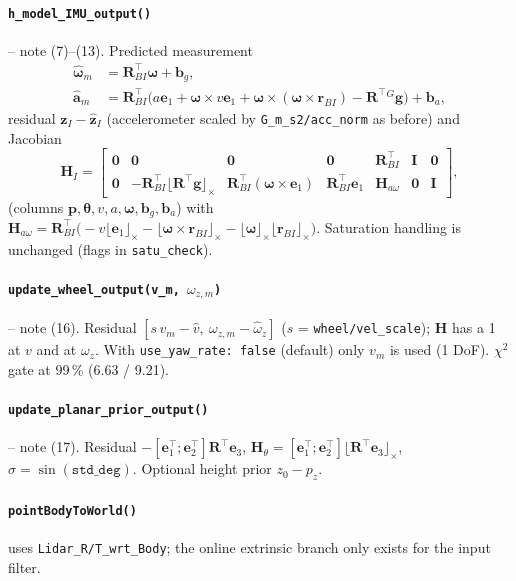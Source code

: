 \documentclass[11pt,a4paper]{article}
\newcommand{\f}[1]{\texttt{#1}}
\newcommand{\R}{\mathbf{R}}
\newcommand{\p}{\mathbf{p}}
\newcommand{\w}{\bm{\omega}}
\newcommand{\e}{\mathbf{e}}
\newcommand{\g}{\mathbf{g}}
\newcommand{\skw}[1]{\lfloor #1\rfloor_\times}
\begin{document}
\paragraph{\f{h\_model\_IMU\_output()}} -- note (7)--(13). Predicted measurement
\begin{align*}
\hat{\w}_m &= \R_{BI}^\top\w+\mathbf b_g,\\
\hat{\mathbf a}_m &= \R_{BI}^\top\big(a\e_1+\w\times v\e_1+\w\times(\w\times\mathbf r_{BI})-\R^\top{}^G\g\big)+\mathbf b_a,
\end{align*}
residual $\mathbf z_I-\hat{\mathbf z}_I$ (accelerometer scaled by
\f{G\_m\_s2/acc\_norm} as before) and Jacobian
\[
\mathbf H_I=\begin{bmatrix}
\mathbf 0 & \mathbf 0 & \mathbf 0 & \mathbf 0 & \R_{BI}^\top & \mathbf I & \mathbf 0\\
\mathbf 0 & -\R_{BI}^\top\skw{\R^\top\g} & \R_{BI}^\top(\w\times\e_1) & \R_{BI}^\top\e_1 & \mathbf H_{a\omega} & \mathbf 0 & \mathbf I
\end{bmatrix},
\]
(columns $\p,\bm\theta,v,a,\w,\mathbf b_g,\mathbf b_a$) with
$\mathbf H_{a\omega}=\R_{BI}^\top\big(-v\skw{\e_1}-\skw{\w\times\mathbf r_{BI}}-\skw{\w}\skw{\mathbf r_{BI}}\big)$.
Saturation handling is unchanged (flags in \f{satu\_check}).

\paragraph{\f{update\_wheel\_output(v\_m, $\omega_{z,m}$)}} -- note (16).
Residual $[s\,v_m-\hat v,\ \omega_{z,m}-\hat\omega_z]$ ($s$ = \f{wheel/vel\_scale});
$\mathbf H$ has a 1 at $v$ and at $\omega_z$. With \f{use\_yaw\_rate: false}
(default) only $v_m$ is used (1 DoF). $\chi^2$ gate at 99\,\% (6.63 / 9.21).

\paragraph{\f{update\_planar\_prior\_output()}} -- note (17). Residual
$-[\e_1^\top;\e_2^\top]\R^\top\e_3$, $\mathbf H_\theta=[\e_1^\top;\e_2^\top]\skw{\R^\top\e_3}$,
$\sigma=\sin(\f{std\_deg})$. Optional height prior $z_0-p_z$.

\paragraph{\f{pointBodyToWorld()}} uses \f{Lidar\_R/T\_wrt\_Body}; the online
extrinsic branch only exists for the input filter.
\end{document}
